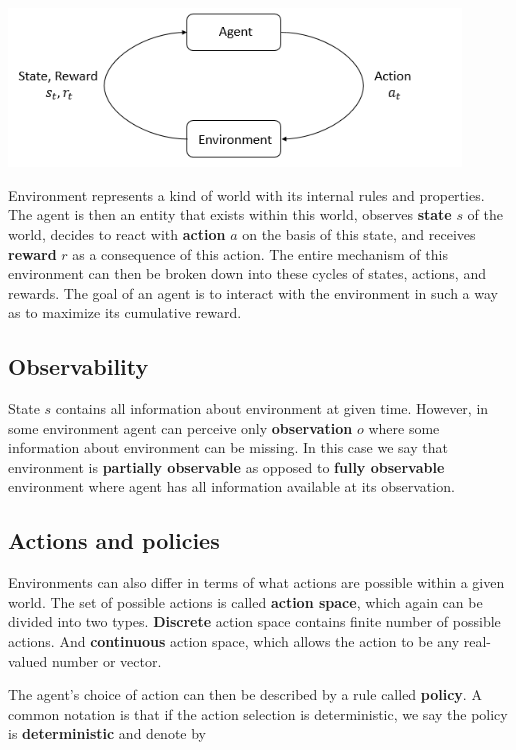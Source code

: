 \includegraphics*[width=12cm]{rl_diagram_transparent_bg.png}\label{RLDiagram}

Environment represents a kind of world with its internal rules and properties. 
The agent is then an entity that exists within this world, observes \textbf{state} $s$ of the world, decides to react with \textbf{action} $a$ on the basis of this state, and receives \textbf{reward} $r$ as a consequence of this action.
The entire mechanism of this environment can then be broken down into these cycles of states, actions, and rewards.
The goal of an agent is to interact with the environment in such a way as to maximize its cumulative reward.



\subsection*{Observability}
State $s$ contains all information about environment at given time. 
However, in some environment agent can perceive only \textbf{observation} $o$ where some information about environment can be missing.
In this case we say that environment is \textbf{partially observable} as opposed to \textbf{fully observable} environment where agent has all information available at its observation.

\subsection*{Actions and policies}
Environments can also differ in terms of what actions are possible within a given world.
The set of possible actions is called \textbf{action space}, which again can be divided into two types. 
\textbf{Discrete} action space contains finite number of possible actions. 
And \textbf{continuous} action space, which allows the action to be any real-valued number or vector.

The agent's choice of action can then be described by a rule called \textbf{policy}. 
A common notation is that if the action selection is deterministic, we say the policy is \textbf{deterministic} and denote by

